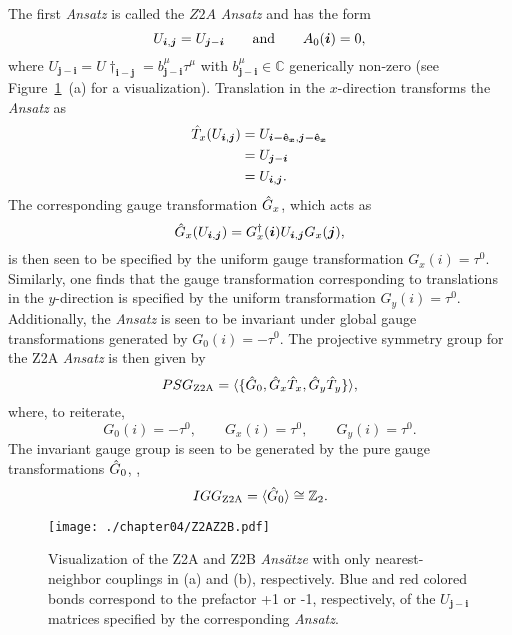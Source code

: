 The first \textit{Ansatz} is called the $Z2A$ \textit{Ansatz} and has the form~\cite{WenPLA2002}
%
\begin{equation}
	U_{\bm{i},\bm{j}} = U_{\bm{j}-\bm{i}} \qquad {\rm and } \qquad A_0(\bm{i}) = 0,
\end{equation}
%
where $U_{\bm{j}-\bm{i}} = U\dag_{\bm{i}-\bm{j}} = b^{\mu}_{\bm{j}-\bm{i}} \tau^{\mu}$ with $b^{\mu}_{\bm{j}-\bm{i}} \in \mathbb{C}$ generically non-zero (see Figure~\ref{fig:chapter04_Z2AZ2B}~(a) for a visualization).
Translation in the $x$-direction transforms the \textit{Ansatz} as
%
\begin{align}
	\hat{T}_x (U_{\bm{i},\bm{j}}) &= U_{\bm{i-\mathbf{\hat{e}}_x},\bm{j-\mathbf{\hat{e}}_x}} \nonumber\\
								 &= U_{\bm{j}-\bm{i}} \nonumber\\
								 &= U_{\bm{i},\bm{j}}.
\end{align}
%
The corresponding gauge transformation $\hat{G}_x$, which acts as
%
\begin{equation}
	\hat{G}_x (U_{\bm{i},\bm{j}}) = G^{\dagger}_x(\bm{i}) U_{\bm{i},\bm{j}} G_x(\bm{j}),
\end{equation}
%
is then seen to be specified by the uniform gauge transformation $G_x(i) = \tau^0$.
Similarly, one finds that the gauge transformation corresponding to translations in the $y$-direction is specified by the uniform transformation $G_y(i) = \tau^0$.
Additionally, the \textit{Ansatz} is seen to be invariant under global gauge transformations generated by $G_0(i) = -\tau^0$.
The projective symmetry group for the Z2A \textit{Ansatz} is then given by
%
\begin{equation}
	PSG_{\rm Z2A} = \langle \{ \hat{G}_0, \hat{G}_x \hat{T}_x, \hat{G}_y \hat{T}_y \} \rangle,
\end{equation}
%
where, to reiterate,
%
\begin{equation}
	G_0(i) = -\tau^0, \qquad G_x(i) = \tau^0, \qquad G_y(i) = \tau^0.
\end{equation}
%
The invariant gauge group is seen to be generated by the pure gauge transformations $\hat{G}_0$, \ie,
%
\begin{equation}
	IGG_{\rm Z2A} = \langle \hat{G}_0 \rangle \cong \mathbb{Z}_{2}.
\end{equation}
%
%
\begin{figure}[tb]
	\centering
	\texttt{[image: ./chapter04/Z2AZ2B.pdf]}
	\caption{
		Visualization of the Z2A and Z2B \textit{Ans\"atze} with only nearest-neighbor couplings in (a) and (b), respectively. Blue and red colored bonds correspond to the prefactor +1 or -1, respectively, of the $U_{\bm{j}-\bm{i}}$ matrices specified by the corresponding \textit{Ansatz}.
	}
	\label{fig:chapter04_Z2AZ2B}
\end{figure}
%

